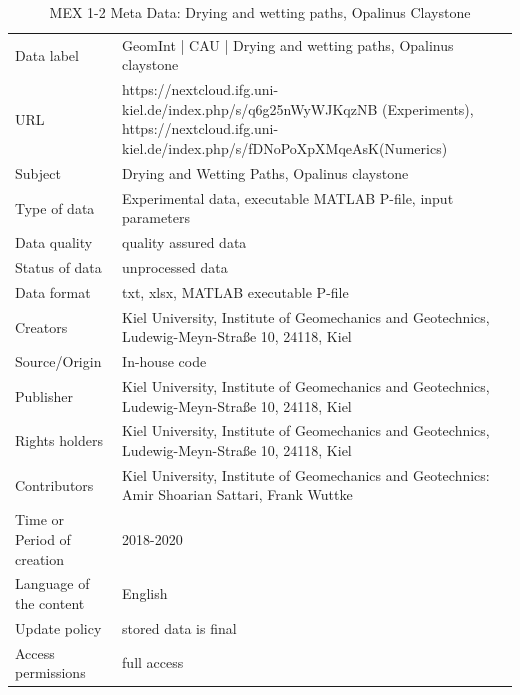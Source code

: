 \begin{table}[!ht]
\caption{MEX 1-2 Meta Data: Drying and wetting paths, Opalinus Claystone}
\label{tab:dms-mex1-2}
\small
\begin{tabular}{R{3cm}|L{7cm}}
\hline
%
Data label & GeomInt | CAU | Drying and wetting paths, Opalinus claystone\\
URL &  https://nextcloud.ifg.uni-kiel.de/index.php/s/q6g25nWyWJKqzNB (Experiments), https://nextcloud.ifg.uni-kiel.de/index.php/s/fDNoPoXpXMqeAsK(Numerics)
\\
Subject  &  Drying and Wetting Paths, Opalinus claystone\\
Type of data  & Experimental data, executable MATLAB P-file, input parameters\\
Data quality  &  quality assured data \\
Status of data  &  unprocessed data\\
Data format  & txt, xlsx, MATLAB executable P-file\\
Creators  &  Kiel University, Institute of Geomechanics and Geotechnics, Ludewig-Meyn-Stra\ss e 10, 24118, Kiel\\
Source/Origin & In-house code \\
Publisher  &  Kiel University, Institute of Geomechanics and Geotechnics, Ludewig-Meyn-Stra\ss e 10, 24118, Kiel \\
Rights holders &  Kiel University, Institute of Geomechanics and Geotechnics, Ludewig-Meyn-Stra\ss e 10, 24118, Kiel \\
Contributors &   Kiel University, Institute of Geomechanics and Geotechnics: Amir Shoarian Sattari, Frank Wuttke\\
Time or Period of creation &  2018-2020\\
Language of the content &  English\\
Update policy &  stored data is final\\
Access permissions & full access\\
%
\hline
\end{tabular}
\end{table}